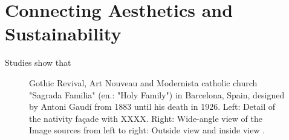 \documentclass{article}
\begin{document}
\clearpage
\section{Connecting Aesthetics and Sustainability}

Studies show that 




\begin{figure}
    \centering
    \caption{Gothic Revival, Art Nouveau and Modernista catholic church "Sagrada Familia" (en.: "Holy Family") in Barcelona, Spain, designed by Antoni Gaudí from 1883 until his death in 1926. Left: Detail of the nativity façade with XXXX. Right: Wide-angle view of the   Image sources from left to right: Outside view \cite{mortel_sagrada_2016} and inside view \cite{wikimedia_commons_user_t_meltzer_sagrada_2014}.}
    \label{fig:kunstformen}
\end{figure}
\end{document}
